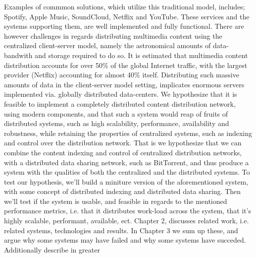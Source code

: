 Examples of commmon solutions, which utilize this traditional model, includes;
Spotify, Apple Music, SoundCloud, Netflix and YouTube.
\newline
These services and the systems supporting them, are well implemented and
fully functional. There are however challenges in regards distributing
multimedia content using the centralized client-server model, namely the 
astronomical amounts of data-bandwith and storage required to do so.
\newline
It is estimated that multimedia content distribution accounts for over 50\% of
the global Internet traffic, with the largest provider (Netflix) accounting for
almost 40\% itself\citep{sandvine:2015}.
\newline
Distributing such massive amounts of data in the client-server model setting, 
implicates enormous servers implemented via. globally distributed data-centers.
\newline\newline
We hypothesize that it is feasible to implement a completely distributed
content distribution network, using modern components, and that such a system
would reap of fruits of distributed systems, such as high scalability, 
performance, availability and robustness, while retaining the properties of 
centralized systems, such as indexing and control over the distribution network.
\newline
That is we hypothesize that we can combine the content indexing and control of
centralized distribution networks, with a distributed data sharing network,
such as BitTorrent, and thus produce a system with the qualities of both the
centralized and the distributed systems.
\newline\newline
To test our hypothesis, we'll build a miniture version of the aforementioned
system, with some concept of distributed indexing and distributed data
sharing.
\newline
Then we'll test if the system is usable, and feasible in regards to the
mentioned performance metrics, i.e. that it distributes work-load across the
system, that it's highly scalable, performant, available, ect.
\newline\newline
Chapter 2, discusses related work, i.e. related systems, technologies and 
results. In Chapter 3 we sum up these, and argue why some systems may have
failed and why some systems have succeded. Additionally describe in greater
